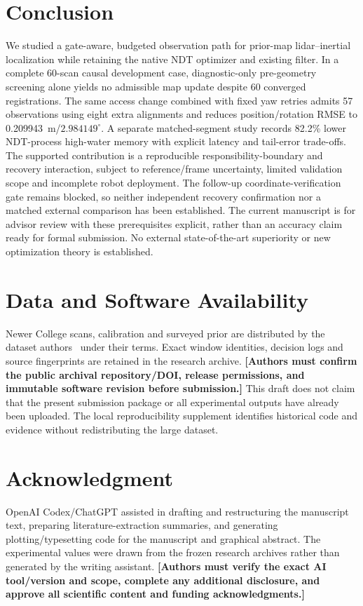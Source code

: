 \documentclass[journal,10pt,letterpaper]{IEEEtran}
\newcommand{\placeholder}[1]{\textbf{[#1]}}
\begin{document}
\section{Conclusion}
We studied a gate-aware, budgeted observation path for prior-map lidar--inertial localization while retaining the native NDT optimizer and existing filter. In a complete 60-scan causal development case, diagnostic-only pre-geometry screening alone yields no admissible map update despite 60 converged registrations. The same access change combined with fixed yaw retries admits 57 observations using eight extra alignments and reduces position/rotation RMSE to 0.209943~m/$2.984149^\circ$. A separate matched-segment study records 82.2\% lower NDT-process high-water memory with explicit latency and tail-error trade-offs. The supported contribution is a reproducible responsibility-boundary and recovery interaction, subject to reference/frame uncertainty, limited validation scope and incomplete robot deployment. The follow-up coordinate-verification gate remains blocked, so neither independent recovery confirmation nor a matched external comparison has been established. The current manuscript is for advisor review with these prerequisites explicit, rather than an accuracy claim ready for formal submission. No external state-of-the-art superiority or new optimization theory is established.

\section*{Data and Software Availability}
Newer College scans, calibration and surveyed prior are distributed by the dataset authors~\cite{newer,ncindex,ncref} under their terms. Exact window identities, decision logs and source fingerprints are retained in the research archive. \placeholder{Authors must confirm the public archival repository/DOI, release permissions, and immutable software revision before submission.} This draft does not claim that the present submission package or all experimental outputs have already been uploaded. The local reproducibility supplement identifies historical code and evidence without redistributing the large dataset.

\section*{Acknowledgment}
OpenAI Codex/ChatGPT assisted in drafting and restructuring the manuscript text, preparing literature-extraction summaries, and generating plotting/typesetting code for the manuscript and graphical abstract. The experimental values were drawn from the frozen research archives rather than generated by the writing assistant. \placeholder{Authors must verify the exact AI tool/version and scope, complete any additional disclosure, and approve all scientific content and funding acknowledgments.}



\end{document}
